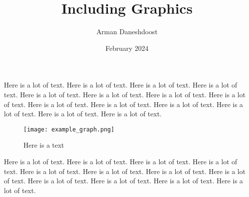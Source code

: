 \documentclass{article}
\title{Including Graphics}
\author{Arman Daneshdoost}
\date{February 2024}
\begin{document}
\maketitle
\listoffigures %
\listoftables %
Here is a lot of text. Here is a lot of text. Here is a lot of text. Here is a lot of text. Here is a lot of text. Here is a lot of text. 
Here is a lot of text. Here is a lot of text. Here is a lot of text. Here is a lot of text. Here is a lot of text. Here is a lot of text. Here is a lot of text. Here is a lot of text. 
	\begin{wrapfigure}{l}{0.5\textwidth} %
	\texttt{[image: example\_graph.png]}
	\caption{Here is a text}
	\end{wrapfigure}
	\begin{comment}
		\begin{figure}[h!]
		\centering
		\caption{Here is a caption} %
		\texttt{[image: example\_graph.png]} %
		\end{figure}
	\end{comment}
Here is a lot of text. Here is a lot of text. Here is a lot of text. Here is a lot of text. Here is a lot of text. Here is a lot of text. 
Here is a lot of text. Here is a lot of text. Here is a lot of text. Here is a lot of text. Here is a lot of text. Here is a lot of text. 
\end{document}
